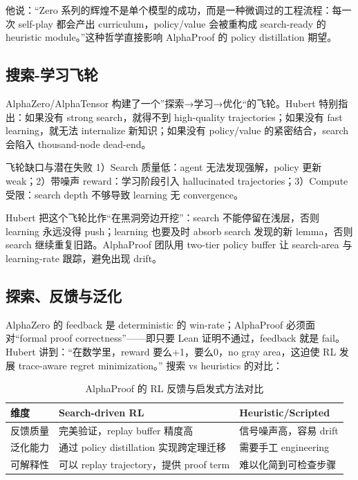 \documentclass[a4paper]{article}
\begin{document}
他说：“Zero 系列的辉煌不是单个模型的成功，而是一种微调过的工程流程：每一次 self-play 都会产出 curriculum，policy/value 会被重构成 search-ready 的 heuristic module。”这种哲学直接影响 AlphaProof 的 policy distillation 期望。

\subsection{搜索-学习飞轮}
AlphaZero/AlphaTensor 构建了一个”探索→学习→优化“的飞轮。Hubert 特别指出：如果没有 strong search，就得不到 high-quality trajectories；如果没有 fast learning，就无法 internalize 新知识；如果没有 policy/value 的紧密结合，search 会陷入 thousand-node dead-end。
\begin{warningbox}{飞轮缺口与潜在失败}
1）Search 质量低：agent 无法发现强解，policy 更新 weak；2）带噪声 reward：学习阶段引入 hallucinated trajectories；3）Compute 受限：search depth 不够导致 learning 无 convergence。
\end{warningbox}

Hubert 把这个飞轮比作“在黑洞旁边开挖”：search 不能停留在浅层，否则 learning 永远没得 push；learning 也要及时 absorb search 发现的新 lemma，否则 search 继续重复旧路。AlphaProof 团队用 two-tier policy buffer 让 search-area 与 learning-rate 跟踪，避免出现 drift。

\subsection{探索、反馈与泛化}
AlphaZero 的 feedback 是 deterministic 的 win-rate；AlphaProof 必须面对“formal proof correctness”——即只要 Lean 证明不通过，feedback 就是 fail。Hubert 讲到：“在数学里，reward 要么+1，要么0，no gray area，这迫使 RL 发展 trace-aware regret minimization。” 搜索 vs heuristics 的对比：
\begin{table}[H]
\centering
\begin{tabular}{p{4cm}p{4cm}p{4cm}}
\toprule
维度 & Search-driven RL & Heuristic/Scripted \\
\midrule
反馈质量 & 完美验证，replay buffer 精度高 & 信号噪声高，容易 drift \\
泛化能力 & 通过 policy distillation 实现跨定理迁移 & 需要手工 engineering \\
可解释性 & 可以 replay trajectory，提供 proof term & 难以化简到可检查步骤 \\
\bottomrule
\end{tabular}
\caption{AlphaProof 的 RL 反馈与启发式方法对比}
\end{table}
\end{document}
